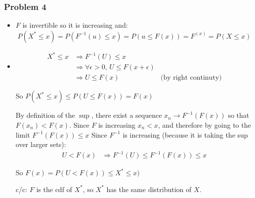 \documentclass[12pt]{article}
\newcommand{\Q}[1]{\subsubsection*{Problem #1}}
\begin{document}
\Q{4}
\begin{itemize}

\item
  $F$ is invertible so it is increasing and:
  $$P(X^* \le x) = P(F^{-1}(u) \le x) = P(u \le F(x)) = F^(x) = P(X \le x)$$
\item

  \begin{align*}
  X^* \le x &\Rightarrow F^{-1}(U) \le x
    \\& \Rightarrow \forall \epsilon > 0, \, U \le F(x+\epsilon)
    \\& \Rightarrow U \le F(x) &\text{(by right continuty)}
  \end{align*}

  So $P(X^* \le x) \le P(U \le F(x)) = F(x)$

  By definition of the $\sup$, there exist a sequence $x_n \rightarrow F^{-1}(F(x))$ so that $F(x_n) < F(x)$. Since $F$ is increasing $x_n < x$, and therefore by going to the limit $F^{-1}(F(x)) \le x$
  Since $F^{-1}$ is increasing (because it is taking the sup over larger sets):
  \begin{align*}
    U < F(x) & \Rightarrow F^{-1}(U) \le F^{-1}(F(x)) \le x
  \end{align*}

  So $F(x) = P(U < F(x)) \le X^* \le x)$

  c/c: $F$ is the cdf of $X^*$, so $X^*$ has the same distribution of $X$.
  
\end{itemize}
\end{document}
